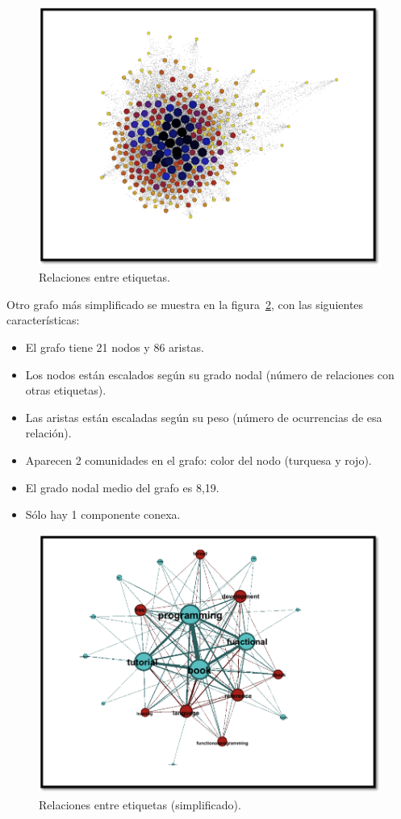 \begin{figure}
\centering
\includegraphics[scale=0.7]{img/7/grafo12}
\caption{Relaciones entre etiquetas.
\label{fig:grafo12}}
\end{figure}

Otro grafo más simplificado se muestra en la figura~\ref{fig:grafo14}, con las siguientes características:
\begin{itemize}
\item    El grafo tiene 21 nodos y 86 aristas.
\item    Los nodos están escalados según su grado nodal (número de relaciones con otras etiquetas).
\item    Las aristas están escaladas según su peso (número de ocurrencias de esa relación).
\item    Aparecen 2 comunidades en el grafo: color del nodo (turquesa y rojo).
\item    El grado nodal medio del grafo es 8,19.
\item    Sólo hay 1 componente conexa.
\end{itemize}

\begin{figure}
\centering
\includegraphics[scale=0.7]{img/7/grafo14}
\caption{Relaciones entre etiquetas (simplificado).
\label{fig:grafo14}}
\end{figure}

